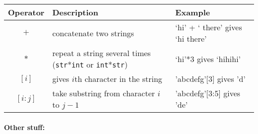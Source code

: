 \documentclass[11pt]{article}
\begin{document}
\begin{center}

\begin{tabular}{|c|l|l|}
\hline
Operator & Description & Example\\
\hline
$+$ & concatenate two strings & `hi' + ` there' gives `hi there'\\
\hline
$*$ & repeat a string several times (\texttt{str}*\texttt{int} or \texttt{int}*\texttt{str}) & `hi'*3 gives `hihihi'\\
\hline
$[i]$ & gives $i$th character in the string & 'abcdefg'[3] gives 'd'\\
\hline
$[i:j]$ & take substring from character $i$ to $j-1$& 'abcdefg'[3:5]
gives 'de'\\
\hline
\end{tabular}
\end{center}

\paragraph{Other stuff:}
\end{document}
